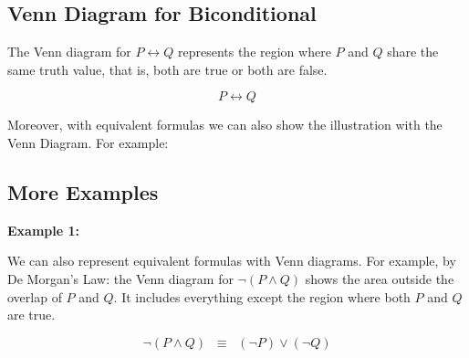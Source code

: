 \documentclass[12pt,a4paper,openany]{article}
\begin{document}
\subsection{Venn Diagram for Biconditional}\label{venn-diagram-for-implication}

The Venn diagram for \(P \leftrightarrow Q\) represents the region where \(P\) and \(Q\) share the same truth value, 
that is, both are true or both are false.  

\[
P \leftrightarrow Q
\]

\begin{center}
\end{center}

Moreover, with equivalent formulas we can also show the illustration with the Venn Diagram. For example:

\subsection{More Examples}\label{more-example}

\textbf{Example 1:}  

We can also represent equivalent formulas with Venn diagrams. For example, by De Morgan's Law: the Venn diagram for \(\neg (P \wedge Q)\) shows the area outside the overlap of \(P\) and \(Q\). It includes everything except the region where both \(P\) and \(Q\) are true.

\[
\neg (P \wedge Q) \;\;\equiv\;\; (\neg P) \vee (\neg Q)
\]

\begin{center}
\end{center}
\end{document}

